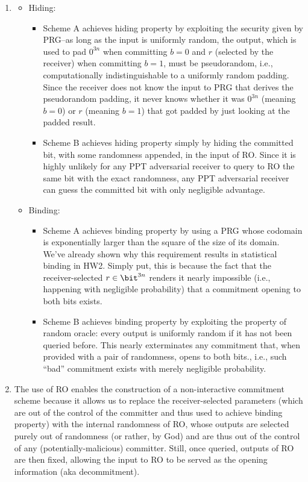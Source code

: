 \begin{answer}[iii]
\begin{enumerate}
        \item[(b)] 
        \begin{itemize}
            \item Hiding: 
            \begin{itemize}
                \item Scheme A achieves hiding property by exploiting the security given by PRG--as long as the input is uniformly random, the output, which is used to pad $0^{3n}$ when committing $b=0$ and $r$ (selected by the receiver) when committing $b=1$, must be pseudorandom, i.e., computationally indistinguishable to a uniformly random padding. Since the receiver does not know the input to PRG that derives the pseudorandom padding, it never knows whether it was $0^{3n}$ (meaning $b=0$)  or $r$  (meaning $b=1$) that got padded by just looking at the padded result.
                \item Scheme B achieves hiding property simply by hiding the committed bit, with some randomness appended, in the input of RO. Since it is highly unlikely for any PPT adversarial receiver to query to RO the same bit with the exact randomness, any PPT adversarial receiver can guess the committed bit with only negligible advantage. 
            \end{itemize}
            
            \item Binding: 
            \begin{itemize}
                \item Scheme A achieves binding property by using a PRG whose codomain is exponentially larger than the square of the size of its domain. We've already shown why this requirement results in statistical binding in HW2. Simply put, this is because the fact that the receiver-selected $r\in\bit^{3n}$ renders it nearly impossible (i.e., happening with negligible probability) that a commitment opening to both bits exists. 
                \item Scheme B achieves binding property by exploiting the property of random oracle: every output is uniformly random if it has not been  queried before. This nearly exterminates any commitment that, when provided with a pair of randomness, opens to both bits., i.e., such ``bad'' commitment exists with merely negligible probability.
            \end{itemize}
        \end{itemize}

        \item[(c)] The use of RO enables the construction of a non-interactive commitment scheme because it allows us to replace the receiver-selected parameters (which are out of the control of the committer and thus used to achieve binding property) with the internal randomness of RO, whose outputs are selected purely out of randomness (or rather, by God) and are thus out of the control of any (potentially-malicious) committer. Still, once queried, outputs of RO are then fixed, allowing the
            input to RO to be served as the opening information (aka decommitment).
        \vspace{-1cm}
    \end{enumerate}
\end{answer}